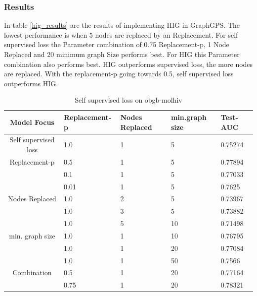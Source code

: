 \subsubsection{Results}
In table \ref{hig_results} are the results of implementing HIG in GraphGPS. The lowest performance is when 5 nodes are replaced by an Replacement. For self supervised loss the Parameter combination of 0.75 Replacement-p, 1 Node Replaced and 20 minimum graph Size performs best. For HIG  this Parameter combination also performs best. HIG outperforms supervised loss, the more nodes are replaced. With the replacement-p going towards 0.5, self supervised loss outperforms HIG.
\begin{table}[ht!]
    \centering
    \caption{Self supervised loss on obgb-molhiv}
    \label{loss_results}
    \begin{tabular}{c || l|l|l|l|}
        Model Focus        & Replacement-p & Nodes Replaced & min.graph size & Test-AUC \\
        \hline
        \hline
        Self supervised loss       & 1.0             & 1                  & 5              & 0.75274  \\
        \hline
        Replacement-p    & 0.5             & 1                  & 5              & 0.77894  \\
                           & 0.1             & 1                  & 5              & 0.77033  \\
                           & 0.01            & 1                  & 5              & 0.7625   \\
        \hline
        Nodes Replaced & 1.0             & 2                  & 5              & 0.73967  \\
                           & 1.0             & 3                  & 5              & 0.73882  \\
                           & 1.0             & 5                  & 10             & 0.71498  \\
        \hline
        min. graph size    & 1.0             & 1                  & 10             & 0.76795  \\
                           & 1.0             & 1                  & 20             & 0.77084  \\
                           & 1.0             & 1                  & 50             & 0.7566   \\
        \hline
        Combination        & 0.5             & 1                  & 20             & 0.77164  \\
                           & 0.75            & 1                  & 20             & 0.78321  \\
    \end{tabular}
\end{table}


